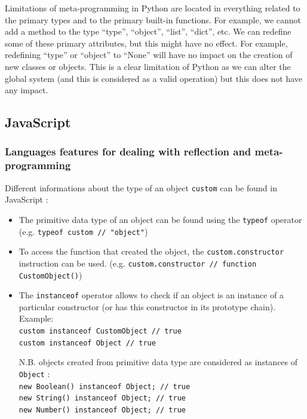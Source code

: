 \documentclass[a4paper,10pt]{article}
\begin{document}
Limitations of meta-programming in Python are located in everything related to the primary types and to the primary built-in functions.
For example, we cannot add a method to the type ``type'', ``object'', ``list'', ``dict'', etc.
We can redefine some of these primary attributes, but this might have no effect.
For example, redefining ``type'' or ``object'' to ``None'' will have no impact on the creation of new classes or objects.
This is a clear limitation of Python as we can alter the global system (and this is considered as a valid operation) but this does not have any impact.


\subsection{JavaScript}

\setjs
\subsubsection{Languages features for dealing with reflection and meta-programming}

Different informations about the type of an object \lstinline|custom| can be found in JavaScript :
\begin{itemize}
\item The primitive data type of an object can be found using the \lstinline|typeof| operator (e.g. \lstinline|typeof custom // "object"|)

\item To access the function that created the object, the \lstinline|custom.constructor| instruction can be used. (e.g. \lstinline|custom.constructor // function CustomObject()|)

\item The \lstinline|instanceof| operator allows to check if an object is an instance of a particular constructor (or has this constructor in its prototype chain). \\
		Example: \\
		\lstinline|custom instanceof CustomObject // true| \\
		\lstinline|custom instanceof Object // true|

		\smallskip
		N.B. objects created from primitive data type are considered as instances of \lstinline|Object| : \\
		\lstinline|new Boolean() instanceof Object; // true| \\
		\lstinline|new String() instanceof Object; // true| \\
		\lstinline|new Number() instanceof Object; // true| \\
\end{itemize}
\end{document}
